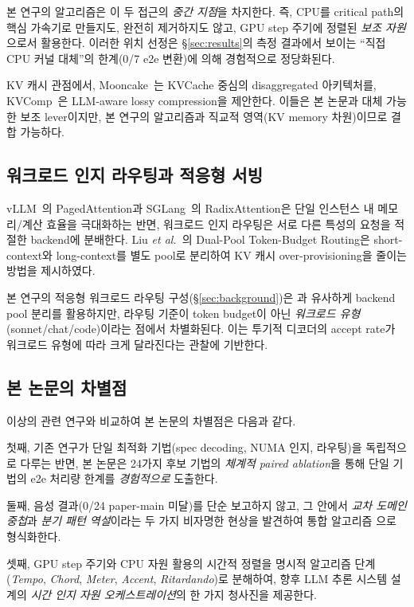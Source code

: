 본 연구의 \algname 알고리즘은 이 두 접근의 \emph{중간 지점}을 차지한다.
즉, CPU를 critical path의 핵심 가속기로 만들지도, 완전히 제거하지도 않고, GPU step 주기에 정렬된 \emph{보조 자원}으로서 활용한다.
이러한 위치 선정은 \S\ref{sec:results}의 측정 결과에서 보이는 ``직접 CPU 커널 대체''의 한계(0/7 e2e 변환)에 의해 경험적으로 정당화된다.

KV 캐시 관점에서, Mooncake~\cite{qin2024mooncake}는 KVCache 중심의 disaggregated 아키텍처를, KVComp~\cite{xia2024kvcomp}은 LLM-aware lossy compression을 제안한다.
이들은 본 논문과 대체 가능한 보조 lever이지만, 본 연구의 \algname 알고리즘과 직교적 영역(KV memory 차원)이므로 결합 가능하다.

\subsection{워크로드 인지 라우팅과 적응형 서빙}

vLLM~\cite{kwon2023vllm}의 PagedAttention과 SGLang~\cite{zheng2024sglang}의 RadixAttention은 단일 인스턴스 내 메모리/계산 효율을 극대화하는 반면, 워크로드 인지 라우팅은 서로 다른 특성의 요청을 적절한 backend에 분배한다.
Liu \emph{et al.}~\cite{liu2026dualpool}의 Dual-Pool Token-Budget Routing은 short-context와 long-context를 별도 pool로 분리하여 KV 캐시 over-provisioning을 줄이는 방법을 제시하였다.

본 연구의 적응형 워크로드 라우팅 구성(\S\ref{sec:background})은 \cite{liu2026dualpool}과 유사하게 backend pool 분리를 활용하지만, 라우팅 기준이 token budget이 아닌 \emph{워크로드 유형}(sonnet/chat/code)이라는 점에서 차별화된다.
이는 투기적 디코더의 accept rate가 워크로드 유형에 따라 크게 달라진다는 관찰에 기반한다.

\subsection{본 논문의 차별점}

이상의 관련 연구와 비교하여 본 논문의 차별점은 다음과 같다.

첫째, 기존 연구가 단일 최적화 기법(spec decoding, NUMA 인지, 라우팅)을 독립적으로 다루는 반면, 본 논문은 24가지 후보 기법의 \emph{체계적 paired ablation}을 통해 단일 기법의 e2e 처리량 한계를 \emph{경험적으로} 도출한다.

둘째, 음성 결과(0/24 paper-main 미달)를 단순 보고하지 않고, 그 안에서 \emph{교차 도메인 중첩}과 \emph{분기 패턴 역설}이라는 두 가지 비자명한 현상을 발견하여 통합 알고리즘 \algname 으로 형식화한다.

셋째, GPU step 주기와 CPU 자원 활용의 시간적 정렬을 명시적 알고리즘 단계(\emph{Tempo}, \emph{Chord}, \emph{Meter}, \emph{Accent}, \emph{Ritardando})로 분해하여, 향후 LLM 추론 시스템 설계의 \emph{시간 인지 자원 오케스트레이션}의 한 가지 청사진을 제공한다.
